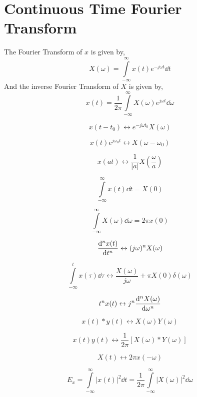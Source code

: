 		\section{Continuous Time Fourier Transform}
		The Fourier Transform of $x$ is given by,
		\[X(\omega)=\int\limits_{-\infty}^\infty x(t)e^{-j\omega t}\dd{t}\]
		And the inverse Fourier Transform of $X$ is given by,
		\[x(t)=\frac{1}{2\pi}\int\limits_{-\infty}^\infty X(\omega)e^{j\omega t}\dd{\omega}\]
		\begin{theorem}
			\[x(t-t_0)\leftrightarrow e^{-j\omega t_0}X(\omega)\]
		\end{theorem}
		\begin{theorem}
			\[x(t)e^{j\omega_0 t}\leftrightarrow X(\omega-\omega_0)\]
		\end{theorem}
		\begin{theorem}
			\[x(at)\leftrightarrow \frac{1}{|a|}X\left(\frac{\omega}{a}\right)\]
		\end{theorem}
		\begin{theorem}
			\[\int\limits_{-\infty}^\infty x(t)\dd{t}=X(0)\]
		\end{theorem}
		\begin{theorem}
			\[\int\limits_{-\infty}^\infty X(\omega)\dd{\omega}=2\pi x(0)\]
		\end{theorem}
		\begin{theorem}
			\[\dv[n]{x(t)}{t}\leftrightarrow (j\omega)^nX(\omega)\]
		\end{theorem}
		\begin{theorem}
			\[\int\limits_{-\infty}^t x(\tau)\dd{\tau}\leftrightarrow \frac{X(\omega)}{j\omega}+\pi X(0)\delta(\omega)\]
		\end{theorem}
		\begin{theorem}
			\[t^nx(t)\leftrightarrow j^n\dv[n]{X(\omega)}{\omega}\]
		\end{theorem}
		\begin{theorem}
			\[x(t)\ast y(t)\leftrightarrow X(\omega)Y(\omega)\]
		\end{theorem}
		\begin{theorem}
			\[x(t)y(t)\leftrightarrow \frac{1}{2\pi}\left[X(\omega)\ast Y(\omega)\right]\]
		\end{theorem}
		\begin{theorem}[Duality]
			\[X(t)\leftrightarrow 2\pi x(-\omega)\]
		\end{theorem}
		\begin{theorem}
			\[E_x=\int\limits_{-\infty}^\infty |x(t)|^2\dd{t}=\frac{1}{2\pi}\int\limits_{-\infty}^\infty |X(\omega)|^2\dd{\omega}\]
		\end{theorem}
